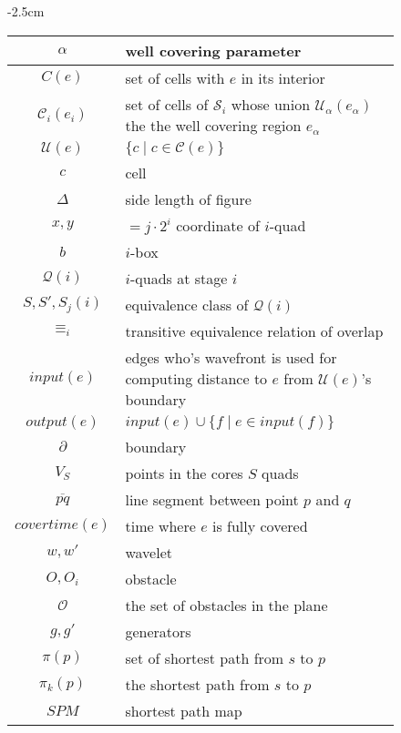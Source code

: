 \begin{figure}
\begin{center}
    \addtolength{\leftskip} {-2.5cm} %
    \addtolength{\rightskip}{-2.5cm}
\begin{tabular}{| c | l |}
    \hline
	$\alpha$ & well covering parameter \\
	\hline
	$C(e)$ & set of cells with $e$ in its interior \\
	$\mathcal{C}_i(e_i)$ & set of cells of $\mathcal{S}_i$ whose union $\mathcal{U}_{\alpha}(e_\alpha)$ the the well covering region $e_{\alpha}$ \\ 
	\hline
	$\mathcal{U}(e)$ & $\{c \mid c \in \mathcal{C}(e)\}$ \\
	\hline
	$c$ & cell \\
    \hline
	$\Delta$ & side length of figure \\
	\hline
	$x,y$ & $= j \cdot 2^i$ coordinate of $i$-quad \\
	\hline
	$b$ & $i$-box \\
	\hline
	$\mathcal{Q}(i)$ & $i$-quads at stage $i$ \\
	\hline
	$S, S', S_j(i)$ & equivalence class of $\mathcal{Q}(i)$ \\
	\hline
	$\equiv_i$ & transitive equivalence relation of overlap \\
    \hline
	$input(e)$ & edges who's wavefront is used for computing distance to $e$ from $\mathcal{U}(e)$'s boundary \\
	\hline
	$output(e)$ & $input(e) \cup \{f \mid e \in input(f)\}$ \\
	\hline
	$\partial$ & boundary \\
	\hline
	$V_S$ & points in the cores $S$ quads \\
	\hline
	$\overline{pq}$ & line segment between point $p$ and $q$ \\
	\hline
	$covertime(e)$ & time where $e$ is fully covered \\
	\hline
	$w,w'$ & wavelet \\
	\hline
	$O, O_i$ & obstacle \\
	\hline
	$\mathcal{O}$ & the set of obstacles in the plane \\
	\hline
	$g,g'$ & generators \\
	\hline
	$\pi(p)$ & set of shortest path from $s$ to $p$ \\
	\hline
	$\pi_k(p)$ & the shortest path from $s$ to $p$ \\
	\hline
	$SPM$ & shortest path map \\

\end{tabular}
\end{center}
\end{figure}

